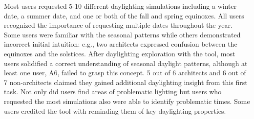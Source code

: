 \documentclass{article}
\begin{document}
Most users requested 5-10 different daylighting simulations
including
a winter date, a summer date, and one or both of
the fall and spring equinoxes.  
All users recognized the importance of requesting
multiple dates throughout the year.  Some users were familiar with the
seasonal patterns while others demonstrated incorrect initial
intuition: e.g., two architects expressed confusion between the
equinoxes and the solstices.  After daylighting exploration with the
tool, most users solidified a correct understanding of seasonal
daylight patterns, although at least one user, A6, failed to grasp
this concept.  
%
%
5 out of 6 architects and 6 out of 7 non-architects claimed they
gained additional daylighting insight from this first task.
Not only did users find areas of problematic lighting but users who
requested the most simulations also were able to identify problematic
times. 
Some users credited the tool with reminding them
of key
daylighting properties.
\end{document}

